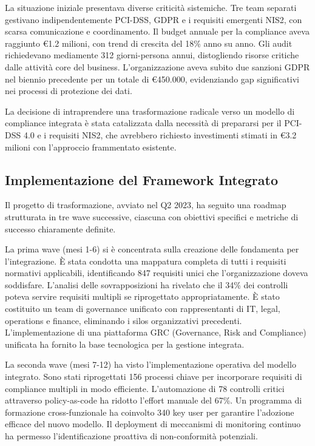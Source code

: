 La situazione iniziale presentava diverse criticità sistemiche. Tre team separati gestivano indipendentemente PCI-DSS, GDPR e i requisiti emergenti NIS2, con scarsa comunicazione e coordinamento. Il budget annuale per la compliance aveva raggiunto €1.2 milioni, con trend di crescita del 18\% anno su anno. Gli audit richiedevano mediamente 312 giorni-persona annui, distogliendo risorse critiche dalle attività core del business. L'organizzazione aveva subito due sanzioni GDPR nel biennio precedente per un totale di €450.000, evidenziando gap significativi nei processi di protezione dei dati.

La decisione di intraprendere una trasformazione radicale verso un modello di compliance integrata è stata catalizzata dalla necessità di prepararsi per il PCI-DSS 4.0 e i requisiti NIS2, che avrebbero richiesto investimenti stimati in €3.2 milioni con l'approccio frammentato esistente.

\subsection{Implementazione del Framework Integrato}

Il progetto di trasformazione, avviato nel Q2 2023, ha seguito una roadmap strutturata in tre wave successive, ciascuna con obiettivi specifici e metriche di successo chiaramente definite.

La prima wave (mesi 1-6) si è concentrata sulla creazione delle fondamenta per l'integrazione. È stata condotta una mappatura completa di tutti i requisiti normativi applicabili, identificando 847 requisiti unici che l'organizzazione doveva soddisfare. L'analisi delle sovrapposizioni ha rivelato che il 34\% dei controlli poteva servire requisiti multipli se riprogettato appropriatamente. È stato costituito un team di governance unificato con rappresentanti di IT, legal, operations e finance, eliminando i silos organizzativi precedenti. L'implementazione di una piattaforma GRC (Governance, Risk and Compliance) unificata ha fornito la base tecnologica per la gestione integrata.

La seconda wave (mesi 7-12) ha visto l'implementazione operativa del modello integrato. Sono stati riprogettati 156 processi chiave per incorporare requisiti di compliance multipli in modo efficiente. L'automazione di 78 controlli critici attraverso policy-as-code ha ridotto l'effort manuale del 67\%. Un programma di formazione cross-funzionale ha coinvolto 340 key user per garantire l'adozione efficace del nuovo modello. Il deployment di meccanismi di monitoring continuo ha permesso l'identificazione proattiva di non-conformità potenziali.

